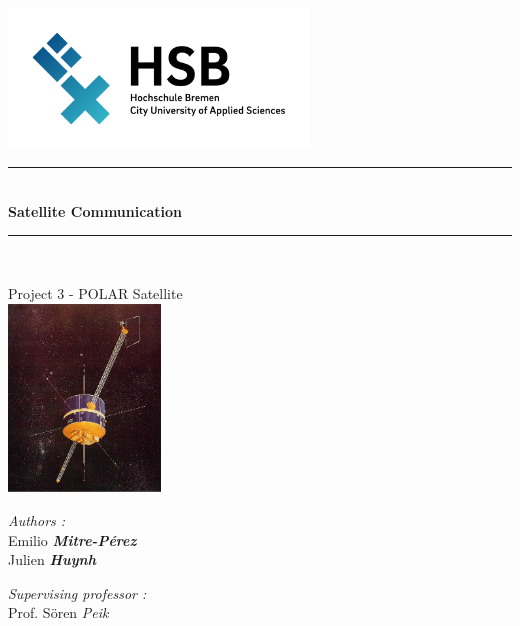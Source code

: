 \documentclass[a4paper,12pt,calibri,oneside,openany]{book}
\theoremstyle{break}
\begin{document}
\renewcommand{\bibname}{Bibliographie et Webographie}

\begin{titlepage}
\begin{center}

\includegraphics[width=0.6\textwidth]{logohsb}\\[1cm]



\rule{\linewidth}{0.5mm} \\[0.4cm]
{ \huge \bfseries Satellite Communication\\[0.4cm] }
\rule{\linewidth}{0.5mm} \\[1.cm]
\begin{center}
		Project 3 - POLAR Satellite\\
		\vspace*{1cm}
		\includegraphics[height=5cm]{polar}
		\vspace*{1cm}
\end{center}


	


\noindent
\begin{minipage}{0.4\textwidth}
  \begin{flushleft} \large
    \emph{Authors :}\\
    Emilio \textbf{\textit{Mitre-Pérez}}\\
    Julien \textbf{\textit{Huynh}}\
  \end{flushleft}
\end{minipage}%
\begin{minipage}{0.4\textwidth}
  \begin{flushright} \large
    \emph{Supervising professor :} \\
    Prof. Sören \textit{Peik}\\
  \end{flushright}
\end{minipage}


\end{center}
\end{titlepage}
\end{document}
